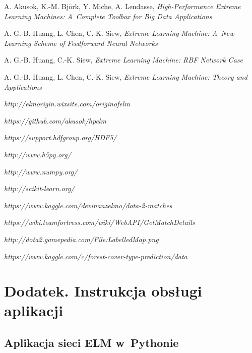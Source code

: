 \documentclass{article}
\begin{document}
\begin{thebibliography}{9}
  A. Akusok, K.-M. Björk, Y. Miche, A. Lendasse,
  \emph{High-Performance Extreme Learning Machines: A~Complete Toolbox for Big Data Applications}


  A. G.-B. Huang, L. Chen, C.-K. Siew, 
  \emph{Extreme Learning Machine: A~New Learning Scheme of Feedforward Neural Networks}
  
  A. G.-B. Huang, C.-K. Siew, 
  \emph{Extreme Learning Machine: RBF Network Case} 

  A. G.-B. Huang, L. Chen, C.-K. Siew, 
  \emph{Extreme Learning Machine: Theory and Applications} 
  
  \emph{http://elmorigin.wixsite.com/originofelm}  
  
  \emph{https://github.com/akusok/hpelm}  
  
  \emph{https://support.hdfgroup.org/HDF5/}  
  
  \emph{http://www.h5py.org/}
  
  \emph{http://www.numpy.org/}  
  
  \emph{http://scikit-learn.org/}  

  \emph{https://www.kaggle.com/devinanzelmo/dota-2-matches}
  
  \emph{https://wiki.teamfortress.com/wiki/WebAPI/GetMatchDetails}
  
  \emph{http://dota2.gamepedia.com/File:Labelled\textunderscore Map.png}

  \emph{https://www.kaggle.com/c/forest-cover-type-prediction/data}
  
\end{thebibliography}

\clearpage
{}
\listoffigures
\clearpage
{}
\listoftables
\clearpage
\section*{Dodatek. Instrukcja obsługi aplikacji}
\subsection*{Aplikacja sieci ELM w~Pythonie}
\end{document}
